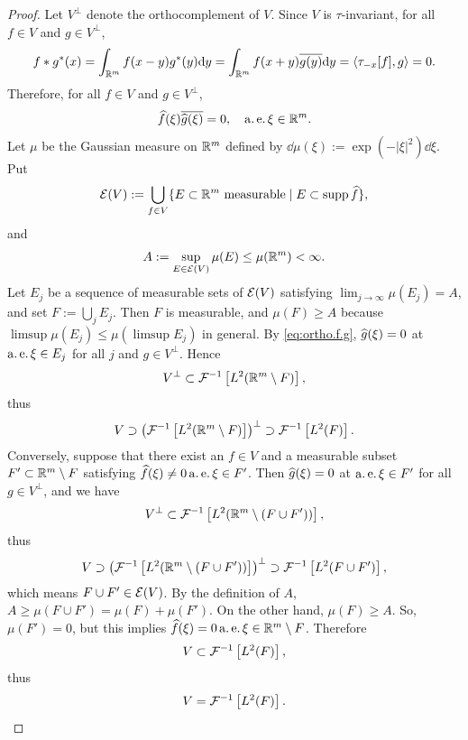 \begin{proof}
Let $V^\perp$ denote the orthocomplement of $V$.
Since $V$ is $\tau$-invariant, for all $f \in V$ and $g \in V^\perp$,
\begin{align*}
    f * g^*(x)
    = \int_{\mathbb{R}^m} f(x-y) g^*(y) \mathrm{d} y
    = \int_{\mathbb{R}^m} f(x+y) \overline{g(y)} \mathrm{d} y
    = \langle \tau_{-x}[f], g \rangle = 0.
\end{align*}
Therefore, for all $f \in V$ and $g \in V^\perp$,
\begin{align}
\widehat{f}(\xi) \overline{\widehat{g}(\xi)} = 0, \quad \operatorname{a.e.} \xi \in \mathbb{R}^m. \label{eq:ortho.f.g}
\end{align}
Let $\mu$ be the Gaussian measure on $\mathbb{R}^m$ defined by $\dd\mu(\xi) := \exp(-|\xi|^2)\dd\xi$. Put
\begin{align*}
    \mathcal{E}(V) := \bigcup_{f \in V} \{ E \subset \mathbb{R}^m \mbox{ measurable} \mid E \subset \operatorname{supp} \widehat{f} \},
\end{align*}
and 
\begin{align*}
    A := \sup_{E \in \mathcal{E}(V)} \mu(E) \le \mu(\mathbb{R}^m) < \infty.
\end{align*}
Let $E_j$ be a sequence of measurable sets of $\mathcal{E}(V)$ satisfying $\lim_{j\to\infty} \mu(E_j) = A$, and set $F := \bigcup_j E_j$. Then $F$ is measurable, and $\mu(F) \ge A$ because $\limsup \mu(E_j) \le \mu( \limsup E_j )$ in general.
By \cref{eq:ortho.f.g}, $\widehat{g}(\xi) = 0$ at $\operatorname{a.e.} \xi \in E_j$ for all $j$ and $g \in V^\perp$. Hence
\begin{align*}
    V^\perp \subset \mathcal{F}^{-1}\left[ L^2( \mathbb{R}^m \setminus F ) \right],
\end{align*}
thus
\begin{align*}
    V \supset \left( \mathcal{F}^{-1}\left[ L^2( \mathbb{R}^m \setminus F)\right] \right)^\perp \supset \mathcal{F}^{-1}\left[ L^2( F ) \right].
\end{align*}
Conversely, suppose that there exist an $f \in V$ and a measurable subset $F' \subset \mathbb{R}^m \setminus F$ satisfying $\widehat{f}(\xi) \neq 0 \operatorname{a.e.} \xi \in F'$.
Then $\widehat{g}(\xi) = 0$ at $\operatorname{a.e.} \xi \in F'$ for all $g \in V^\perp$, and we have
\begin{align*}
V^\perp \subset \mathcal{F}^{-1}\left[ L^2( \mathbb{R}^m \setminus(F \cup F'))\right],
\end{align*}
thus
\begin{align*}
V \supset \left( \mathcal{F}^{-1}\left[ L^2( \mathbb{R}^m \setminus(F \cup F'))\right] \right)^\perp  \supset \mathcal{F}^{-1}\left[ L^2( F \cup F')\right],
\end{align*}
which means $F \cup F' \in \mathcal{E}(V)$. By the definition of $A$, $A \ge \mu(F \cup F') = \mu(F) + \mu(F')$. On the other hand, $\mu(F) \ge A$. So, $\mu(F') = 0$, but this implies $\widehat{f}(\xi) = 0 \operatorname{a.e.} \xi \in \mathbb{R}^m \setminus F$. Therefore
\begin{align*}
    V \subset \mathcal{F}^{-1}\left[ L^2(F) \right],
\end{align*}
thus 
\begin{align*}
    V = \mathcal{F}^{-1}\left[ L^2(F) \right].
\end{align*}
\end{proof}

